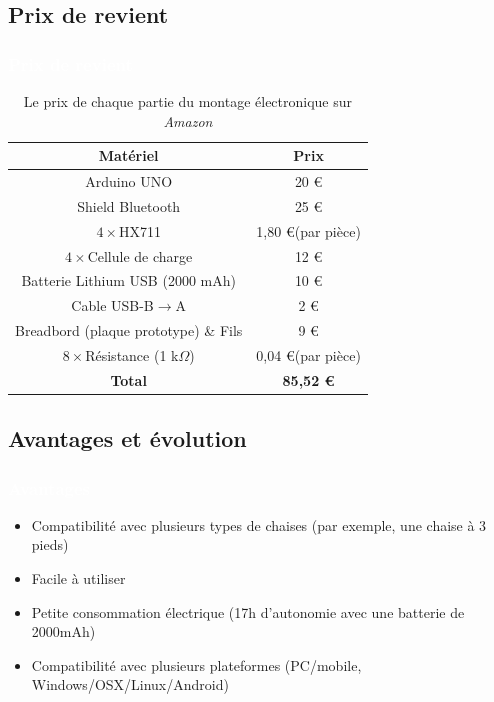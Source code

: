 \documentclass{beamer}
\begin{document}
\subsection{Prix de revient}
\begin{frame}
\frametitle{\textcolor{white}{Prix de revient}}
\begin{table}
\begin{center}
\begin{tabular}{| c | c |}
\hline
\textbf{Matériel} & \textbf{Prix} \\\hline\hline
Arduino UNO & 20 \euro \\\hline
Shield Bluetooth & 25 \euro \\\hline
$4 \times$HX711 & 1,80 \euro (par pièce) \\\hline
$4 \times$Cellule de charge & 12 \euro \\\hline
Batterie Lithium USB (2000 mAh) & 10 \euro \\\hline
Cable USB-B$\rightarrow$A & 2 \euro \\\hline
Breadbord (plaque prototype) \& Fils & 9 \euro \\\hline
$8 \times$Résistance (1 k$\Omega$) & 0,04 \euro (par pièce) \\\hline
\textbf{Total} &  \textbf{85,52 \euro} \\\hline
\end{tabular}
\end{center}
\caption{Le prix de chaque partie du montage électronique sur \textit{Amazon}}
\label{tab:prix_amazon}
\end{table}
\end{frame}

\subsection{Avantages et évolution}
\begin{frame}
\frametitle{\textcolor{white}{Avantages}}

\begin{itemize}
\item Compatibilité avec plusieurs types de chaises (par exemple, une chaise à 3 pieds)
\item Facile à utiliser
\item Petite consommation électrique (17h d'autonomie avec une batterie de 2000mAh)
\item Compatibilité avec plusieurs plateformes (PC/mobile, Windows/OSX/Linux/Android)
\end{itemize}


\end{frame}
\end{document}
